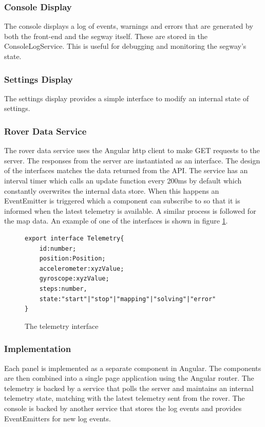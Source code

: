 \subsubsection{Console Display}
The console displays a log of events, warnings and errors that are generated by both the front-end and the segway itself. These are stored in the ConsoleLogService. This is useful for debugging and monitoring the segway's state.

\subsubsection{Settings Display}
The settings display provides a simple interface to modify an internal state of settings.

\subsubsection{Rover Data Service}
The rover data service uses the Angular http client to make GET requests to the server. The responses from the server are instantiated as an interface. The design of the interfaces matches the data returned from the API. The service has an interval timer which calls an update function every 200ms by default which constantly overwrites the internal data store. When this happens an EventEmitter is triggered which a component can subscribe to so that it is informed when the latest telemetry is available. A similar process is followed for the map data.
An example of one of the interfaces is shown in figure \ref{code:telemetry_interface}.

\begin{figure}
    \begin{verbatim}
export interface Telemetry{
    id:number;
    position:Position;
    accelerometer:xyzValue;
    gyroscope:xyzValue;
    steps:number,
    state:"start"|"stop"|"mapping"|"solving"|"error"
}
    \end{verbatim}
    \caption{The telemetry interface}
    \label{code:telemetry_interface}
\end{figure}

\subsubsection{Implementation}
Each panel is implemented as a separate component in Angular. The components are then combined into a single page application using the Angular router.
The telemetry is backed by a service that polls the server and maintains an internal telemetry state, matching with the latest telemetry sent from the rover.
The console is backed by another service that stores the log events and provides EventEmitters for new log events.

